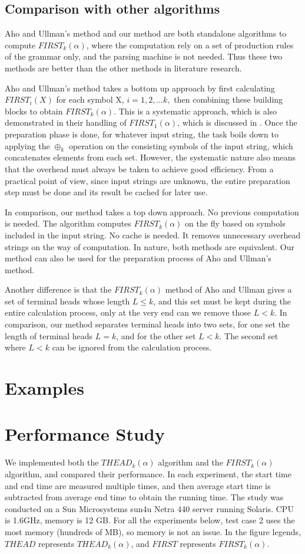 \documentclass{sig-alternate-05-2015}
\begin{document}
\subsection{Comparison with other algorithms}
Aho and Ullman’s method and our method are both
standalone algorithms to compute $FIRST_k(\alpha)$, where the
computation rely on a set of production rules of the grammar
only, and the parsing machine is not needed. Thus
these two methods are better than the other methods in
literature research.

Aho and Ullman’s method takes a bottom up approach
by first calculating $FIRST_i(X)$ for each symbol X, $i = 1, 2,
\ldots k,$ then combining these building blocks to obtain
$FIRST_k(\alpha)$. This is a systematic approach, which is also
demonstrated in their handling of $FIRST_1(\alpha)$, which is
discussed in \cite{aho86compiler}. Once the preparation phase is
done, for whatever input string, the task boils down to
applying the $\oplus_k$ operation on the consisting symbols of
the input string, which concatenates elements from each
set. However, the systematic nature also means that the
overhead must always be taken to achieve good efficiency.
From a practical point of view, since input strings are unknown,
the entire preparation step must be done and its
result be cached for later use.

In comparison, our method takes a top down approach.
No previous computation is needed. The algorithm computes
$FIRST_k(\alpha)$ on the fly based on symbols included in
the input string. No cache is needed. It removes unnecessary
overhead strings on the way of computation.
In nature, both methods are equivalent. Our method can
also be used for the preparation process of Aho and
Ullman’s method.

Another difference is that the $FIRST_k(\alpha)$ method of Aho
and Ullman gives a set of terminal heads whose length $L \leq
k$, and this set must be kept during the entire calculation
process, only at the very end can we remove those $L < k$. In
comparison, our method separates terminal heads into two
sets, for one set the length of terminal heads $L = k$, and for
the other set $L < k$. The second set where $L < k$ can be
ignored from the calculation process.

\section{Examples}


\section{Performance Study}
We implemented both the $THEAD_k(\alpha)$ algorithm and the
$FIRST_k(\alpha)$ algorithm, and compared their performance. In
each experiment, the start time and end time are measured
multiple times, and then average start time is subtracted
from average end time to obtain the running time. The
study was conducted on a Sun Microsystems sun4u Netra
440 server running Solaris. CPU is 1.6GHz, memory is 12
GB. For all the experiments below, test case 2 uses the
most memory (hundreds of MB), so memory is not an issue.
In the figure legends, $THEAD$ represents $THEAD_k(\alpha)$,
and $FIRST$ represents $FIRST_k(\alpha)$.
\end{document}
